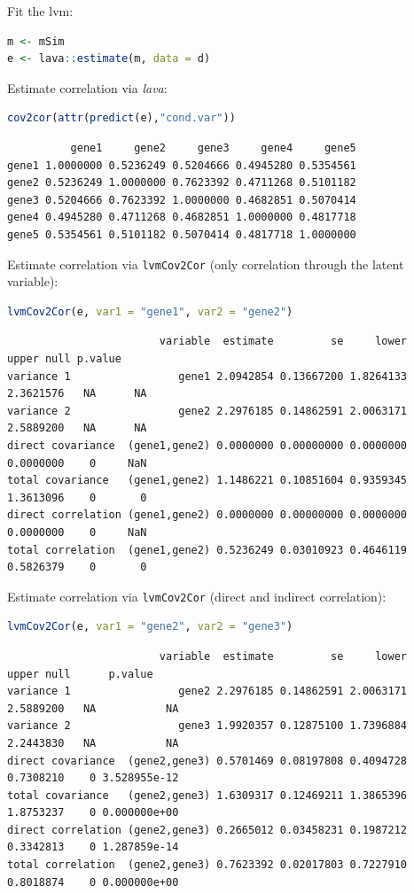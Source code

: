 \documentclass{article}
\begin{document}
Fit the lvm:
\begin{lstlisting}[language=r,numbers=none]
m <- mSim
e <- lava::estimate(m, data = d)
\end{lstlisting}
Estimate correlation via \emph{lava}:
\begin{lstlisting}[language=r,numbers=none]
cov2cor(attr(predict(e),"cond.var"))
\end{lstlisting}

\label{}
\begin{verbatim}
          gene1     gene2     gene3     gene4     gene5
gene1 1.0000000 0.5236249 0.5204666 0.4945280 0.5354561
gene2 0.5236249 1.0000000 0.7623392 0.4711268 0.5101182
gene3 0.5204666 0.7623392 1.0000000 0.4682851 0.5070414
gene4 0.4945280 0.4711268 0.4682851 1.0000000 0.4817718
gene5 0.5354561 0.5101182 0.5070414 0.4817718 1.0000000
\end{verbatim}


Estimate correlation via \texttt{lvmCov2Cor} (only correlation through the latent variable):
\begin{lstlisting}[language=r,numbers=none]
lvmCov2Cor(e, var1 = "gene1", var2 = "gene2")
\end{lstlisting}

\label{}
\begin{verbatim}
                        variable  estimate         se     lower     upper null p.value
variance 1                 gene1 2.0942854 0.13667200 1.8264133 2.3621576   NA      NA
variance 2                 gene2 2.2976185 0.14862591 2.0063171 2.5889200   NA      NA
direct covariance  (gene1,gene2) 0.0000000 0.00000000 0.0000000 0.0000000    0     NaN
total covariance   (gene1,gene2) 1.1486221 0.10851604 0.9359345 1.3613096    0       0
direct correlation (gene1,gene2) 0.0000000 0.00000000 0.0000000 0.0000000    0     NaN
total correlation  (gene1,gene2) 0.5236249 0.03010923 0.4646119 0.5826379    0       0
\end{verbatim}


Estimate correlation via \texttt{lvmCov2Cor} (direct and indirect correlation):
\begin{lstlisting}[language=r,numbers=none]
lvmCov2Cor(e, var1 = "gene2", var2 = "gene3")
\end{lstlisting}

\label{}
\begin{verbatim}
                        variable  estimate         se     lower     upper null      p.value
variance 1                 gene2 2.2976185 0.14862591 2.0063171 2.5889200   NA           NA
variance 2                 gene3 1.9920357 0.12875100 1.7396884 2.2443830   NA           NA
direct covariance  (gene2,gene3) 0.5701469 0.08197808 0.4094728 0.7308210    0 3.528955e-12
total covariance   (gene2,gene3) 1.6309317 0.12469211 1.3865396 1.8753237    0 0.000000e+00
direct correlation (gene2,gene3) 0.2665012 0.03458231 0.1987212 0.3342813    0 1.287859e-14
total correlation  (gene2,gene3) 0.7623392 0.02017803 0.7227910 0.8018874    0 0.000000e+00
\end{verbatim}
\end{document}
